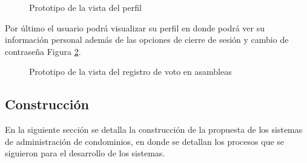 \begin{figure}[H]
    \centering
    \caption{Prototipo de la vista del perfil}
    \label{fig:asambleas-votacion-movil}
\end{figure}

Por último el usuario podrá visualizar su perfil en donde podrá ver su información personal además de las opciones de cierre de sesión y cambio de contraseña Figura \ref{fig:perfil-movil}.

\begin{figure}[H]
    \centering
    \caption{Prototipo de la vista del registro de voto en asambleas}
    \label{fig:perfil-movil}
\end{figure}

\subsection{Construcción}\label{subsec:construccion}
En la siguiente sección se detalla la construcción de la propuesta de los sistemas de administración de condominios, en donde se detallan los procesos que se siguieron para el desarrollo de los sistemas.
